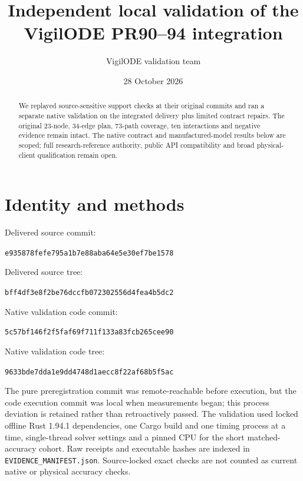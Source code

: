 \documentclass[aps,pra,reprint,onecolumn,10pt,notitlepage,nofootinbib]{revtex4-2}
\begin{document}
\title{Independent local validation of the VigilODE PR90--94 integration}
\author{VigilODE validation team}
\noaffiliation
\date{28 October 2026}
\begin{abstract}
We replayed source-sensitive support checks at their original commits and
ran a separate native validation on the integrated delivery plus limited
contract repairs. The original 23-node, 34-edge plan, 73-path coverage, ten
interactions and negative evidence remain intact. The native contract and
manufactured-model results below are scoped; full research-reference authority,
public API compatibility and broad physical-client qualification remain open.
\end{abstract}
\maketitle

\section{Identity and methods}
Delivered source commit:\par
\noindent\texttt{e935878fefe795a1b7e88aba64e5e30ef7be1578}\par
Delivered source tree:\par
\noindent\texttt{bff4df3e8f2be76dccfb072302556d4fea4b5dc2}\par
Native validation code commit:\par
\noindent\texttt{5c57bf146f2f5faf69f711f133a83fcb265cee90}\par
Native validation code tree:\par
\noindent\texttt{9633bde7dda1e9dd4748d1aecc8f22af68b5f5ac}\par
The pure preregistration commit was remote-reachable before execution, but the code execution commit was local when measurements began; this process deviation is retained rather than retroactively passed.
The validation used locked offline Rust 1.94.1 dependencies, one Cargo build
and one timing process at a time, single-thread solver settings and a pinned
CPU for the short matched-accuracy cohort. Raw receipts and executable hashes
are indexed in \texttt{EVIDENCE\_MANIFEST.json}. Source-locked exact checks
are not counted as current native or physical accuracy checks.
\end{document}
